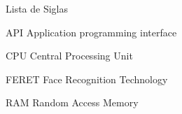 \begin{listofabbrv}{Lista de Siglas}
  \item [API] Application programming interface
  \item [CPU] Central Processing Unit
  \item [FERET] Face Recognition Technology
  \item [RAM] Random Access Memory
\end{listofabbrv}